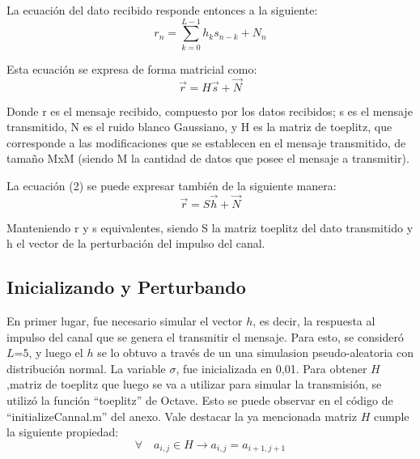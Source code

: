 \documentclass{article}
\begin{document}
\begin{multicols}{2}
\par La ecuación del dato recibido responde entonces a la siguiente:
\begin{equation}
\label{eq1}
r_{n} = \sum_{k=0}^{L-1} h_{k} s_{n-k}+N_{n}
\end{equation}
\par Esta ecuación se expresa de forma matricial como:
\begin{equation}
\label{eq2}
\vec{r} = H\vec{s}+\vec{N}
\end{equation}
\par Donde r es el mensaje recibido, compuesto por los datos recibidos; s es el mensaje transmitido, N es el ruido blanco Gaussiano, y H es la matriz de toeplitz, que corresponde a las modificaciones que se establecen en el mensaje transmitido, de tamaño MxM (siendo M la cantidad de datos que posee el mensaje a transmitir).
\par La ecuación (2) se puede expresar también de la siguiente manera:
\begin{equation}
\label{eq3}
\vec{r} = S\vec{h}+\vec{N}
\end{equation}

\par Manteniendo r y s equivalentes, siendo S la matriz toeplitz del dato transmitido y h el vector de la perturbación del impulso del canal.

\subsection{Inicializando y Perturbando}
\label{sec2}


\par En primer lugar, fue necesario simular el vector $h$, es decir, la respuesta al impulso del canal que se genera el transmitir el mensaje.  Para esto, se consideró $L$=$5$, y luego el $h$ se lo obtuvo a través de un una simulasion pseudo-aleatoria con distribución normal. La variable $\sigma$, fue inicializada en 0,01. Para obtener $H$,matriz de toeplitz que luego se va a utilizar para simular la transmisión, se utilizó la función “toeplitz” de Octave. Esto se puede observar en el código de “initializeCannal.m” del anexo. Vale destacar la ya mencionada matriz $H$ cumple la siguiente propiedad:
\begin{equation}
\forall \quad a_{i,j} \in H \to a_{i,j}=a_{i+1,j+1}
\end{equation}
  

\end{multicols}
\end{document}
